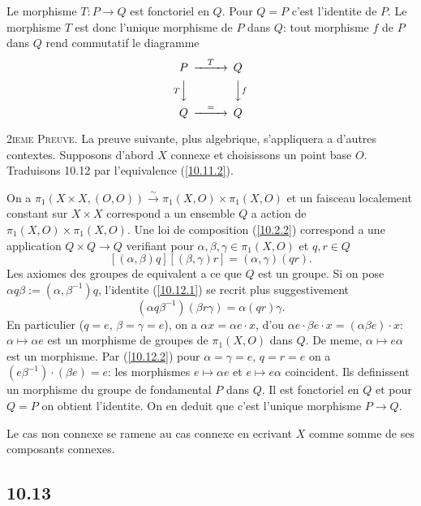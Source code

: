 \documentclass[12pt,a4paper]{article}
\theoremstyle{plain}
\theoremstyle{definition}
\theoremstyle{remark}
\begin{document}
Le morphisme $T: P \to Q$ est fonctoriel en $Q$. Pour $Q = P$ c'est l'identite de $P$. Le morphisme $T$ est donc l'unique morphisme de $P$ dans $Q$: tout morphisme $f$ de $P$ dans $Q$ rend commutatif le diagramme
$$\begin{CD}
P @>{T}>> Q \\
@V{T}VV @VV{f}V \\
Q @>{=}>> Q
\end{CD}$$

\textsc{2ieme Preuve.} La preuve suivante, plus algebrique, s'appliquera a d'autres contextes. Supposons d'abord $X$ connexe et choisissons un point base $O$. Traduisons 10.12 par l'equivalence (\ref{10.11.2}).

On a $\pi_1(X \times X, (O,O)) \xrightarrow{\sim} \pi_1(X,O) \times \pi_1(X,O)$ et un faisceau localement constant sur $X \times X$ correspond a un ensemble $Q$ a action de $\pi_1(X,O) \times \pi_1(X,O)$. Une loi de composition (\ref{10.2.2}) correspond a une application $Q \times Q \to Q$ verifiant pour $\alpha, \beta, \gamma \in \pi_1(X,O)$ et $q, r \in Q$
\begin{equation}\label{10.12.1}
[(\alpha, \beta)q][(\beta, \gamma)r] = (\alpha, \gamma)(qr). \tag{10.12.1}
\end{equation}
Les axiomes des groupes de equivalent a ce que $Q$ est un groupe. Si on pose $\alpha q \beta := (\alpha, \beta^{-1})q$, l'identite (\ref{10.12.1}) se recrit plus suggestivement
\begin{equation}\label{10.12.2}
(\alpha q \beta^{-1})(\beta r \gamma) = \alpha (qr) \gamma. \tag{10.12.2}
\end{equation}
En particulier ($q=e$, $\beta=\gamma=e$), on a $\alpha x = \alpha e \cdot x$, d'ou $\alpha e \cdot \beta e \cdot x = (\alpha \beta e)\cdot x$: $\alpha \mapsto \alpha e$ est un morphisme de groupes de $\pi_1(X,O)$ dans $Q$. De meme, $\alpha \mapsto e\alpha$ est un morphisme. Par (\ref{10.12.2}) pour $\alpha=\gamma=e$, $q=r=e$ on a $(e\beta^{-1})\cdot(\beta e) = e$: les morphismes $e \mapsto \alpha e$ et $e \mapsto e\alpha$ coincident. Ils definissent un morphisme du groupe de fondamental $P$ dans $Q$. Il est fonctoriel en $Q$ et pour $Q = P$ on obtient l'identite. On en deduit que c'est l'unique morphisme $P \to Q$.

Le cas non connexe se ramene au cas connexe en ecrivant $X$ comme somme de ses composants connexes.

\subsection*{10.13}
\end{document}
